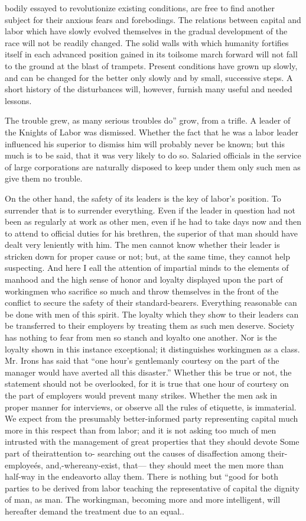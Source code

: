 \documentclass[11pt,openany]{book}
\begin{document}
bodily essayed to revolutionize existing conditions, are free to find another subject for their anxious fears and forebodings. The relations between capital and labor which have slowly evolved themselves in the gradual development of the race will not be readily changed. The solid walls with which humanity fortifies itself in each advanced position gained in its toilsome march forward will not fall to the ground at the blast of trampets. Present conditions have grown up slowly, and can be changed for the better only slowly and by small, successive steps. A short history of the disturbances will, however, furnish many useful and needed lessons.

The trouble grew, as many serious troubles do'' grow, from a trifle. A leader of the Knights of Labor was dismissed. Whether the fact that he was a labor leader influenced his superior to dismiss him will probably never be known; but this much is to be said, that it was very likely to do so. Salaried officials in the service of large corporations are naturally disposed to keep under them only such men as give them no trouble.

On the other hand, the safety of its leaders is the key of labor's position. To surrender that is to surrender everything. Even if the leader in question had not been as regularly at work as other men, even if he had to take days now and then to attend to official duties for his brethren, the superior of that man should have dealt very leniently with him. The men cannot know whether their leader is stricken down for proper cause or not; but, at the same time, they cannot help suspecting. And here I eall the attention of impartial minds to the elements of manhood and the high sense of honor and loyalty displayed upon the part of workingmen who sacrifice so much and throw themselves in the front of the conflict to secure the safety of their standard-bearers. Everything reasonable can be done with men of this spirit. The loyalty which they show to their leaders can be transferred to their employers by treating them as such men deserve. Society has nothing to fear from men so stanch and loyalto one another. Nor is the loyalty shown in this instance exceptional; it distinguishes workingmen as a class. Mr. Irons has said that ``one hour's gentlemanly courtesy on the part of the manager would have averted all this disaster.'' Whether this be true or not, the statement should not be overlooked, for it is true that one hour of courtesy on the part of employers would prevent many strikes. Whether the men ask in proper manner for interviews, or observe all the rules of etiquette, is immaterial. We expect from the presumably better-informed party representing capital much more in this respect than from labor; and it is not asking too much of men intrusted with the management of great properties that they should devote Some part of theirattention to- searching out the causes of disaffection among their-employeés, and,-whereany-exist, that--- they should meet the men more than half-way in the endeavorto allay them. There is nothing but ``good for both parties to be derived from labor teaching the representative of capital the dignity of man, as man. The workingman, becoming more and more intelligent, will hereafter demand the treatment due to an equal..
\end{document}
